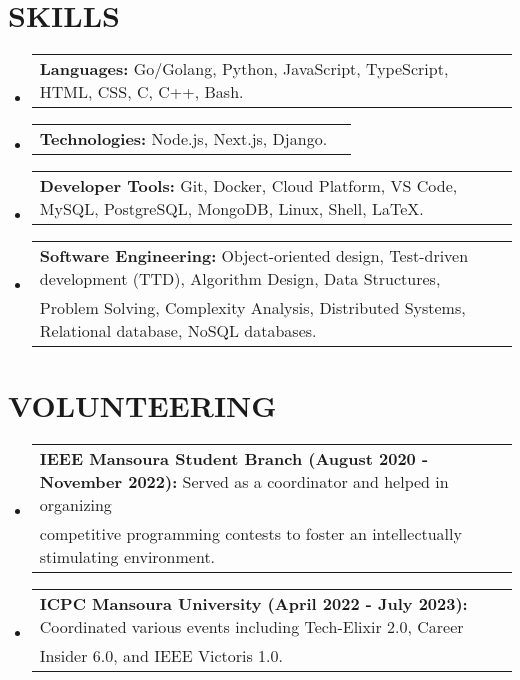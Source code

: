 \documentclass[letterpaper,11pt]{article}
\makeatletter
\newcommand{\resumeProjectHeading}[2]{
    \item
    \begin{tabular*}{\textwidth}{l@{\extracolsep{\fill}}r}
      \small#1 & #2 \\
    \end{tabular*}\vspace{-7pt}
}
\newcommand{\resumeSubHeadingListStart}{\begin{itemize}[leftmargin=0in, label={}]}
\newcommand{\resumeSubHeadingListEnd}{\end{itemize}}
\makeatother
\begin{document}
%
\section{SKILLS}
    \resumeSubHeadingListStart
      \resumeProjectHeading
          {\textbf{Languages:} Go/Golang, Python, JavaScript, TypeScript, HTML, CSS, C, C\small{++}, Bash.}{}
      \resumeProjectHeading
          {\textbf{Technologies:} Node.js, Next.js, Django.}{}
      \resumeProjectHeading
          {\textbf{Developer Tools:} Git, Docker, Cloud Platform, VS Code, MySQL, PostgreSQL, MongoDB, Linux, Shell, LaTeX.}{}
      \resumeProjectHeading
          {\textbf{Software Engineering:} Object-oriented design, Test-driven development (TTD), Algorithm Design, Data Structures,\\Problem Solving, Complexity Analysis, Distributed Systems, Relational database, NoSQL databases.}{}
    \resumeSubHeadingListEnd

%
\section{VOLUNTEERING}
    \resumeSubHeadingListStart
      \resumeProjectHeading
        {\textbf{IEEE Mansoura Student Branch (August 2020 - November 2022):} Served as a coordinator and helped in organizing \\competitive programming contests to foster an intellectually stimulating environment.}{}
      \resumeProjectHeading
        {\textbf{ICPC Mansoura University (April 2022 - July 2023):} Coordinated various events including Tech-Elixir 2.0, Career \\Insider 6.0, and IEEE Victoris 1.0.}{}
    \resumeSubHeadingListEnd
\end{document}
